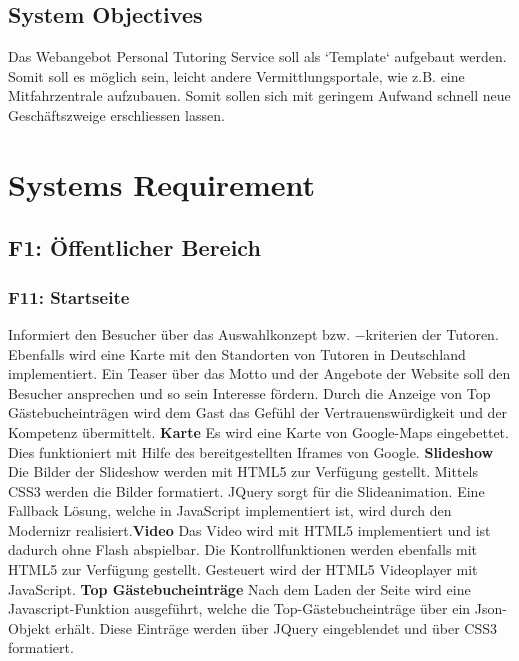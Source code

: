 \documentclass[10pt,a4paper]{scrartcl}
\begin{document}
\subsection{System Objectives}
Das Webangebot Personal Tutoring Service soll als `Template` aufgebaut werden.
Somit soll es möglich sein, leicht andere Vermittlungsportale, wie z.B. eine
Mitfahrzentrale aufzubauen. Somit sollen sich mit geringem Aufwand schnell neue
Geschäftszweige erschliessen lassen.

\section{Systems Requirement}

\subsection{F1: Öffentlicher Bereich}
\subsubsection*{F11: Startseite}
Informiert den Besucher über das Auswahlkonzept bzw. $-$kriterien der Tutoren. Ebenfalls wird eine Karte mit den Standorten von Tutoren in Deutschland implementiert. Ein Teaser über das Motto und der Angebote der Website soll den Besucher ansprechen und so sein Interesse fördern. Durch die Anzeige von Top Gästebucheinträgen wird dem Gast das Gefühl der Vertrauenswürdigkeit und der Kompetenz übermittelt.
\newline \newline
\textbf{Karte}\newline
Es wird eine Karte von Google-Maps eingebettet. Dies funktioniert mit Hilfe des bereitgestellten Iframes von Google.
\newline \newline
\textbf{Slideshow}\newline
Die Bilder der Slideshow werden mit HTML5 zur Verfügung gestellt. Mittels CSS3 werden die Bilder formatiert. JQuery sorgt für die Slideanimation. Eine Fallback L\"osung, welche in JavaScript implementiert ist, wird durch den Modernizr realisiert.​
\newline \newline
\textbf{Video}\newline
Das Video wird mit HTML5 implementiert und ist dadurch ohne Flash abspielbar. Die Kontrollfunktionen werden ebenfalls mit HTML5 zur Verfügung gestellt. Gesteuert wird der HTML5 Videoplayer mit JavaScript.
\newline \newline
\textbf{Top Gästebucheinträge}\newline
Nach dem Laden der Seite wird eine Javascript-Funktion ausgeführt, welche die Top-Gästebucheinträge über ein Json-Objekt erhält. Diese Einträge werden über JQuery eingeblendet und über CSS3 formatiert.
\end{document}
